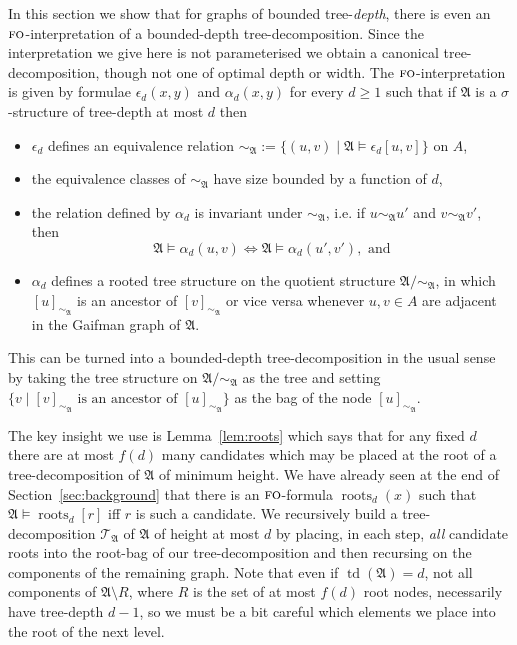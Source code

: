 \documentclass[11pt]{article}
\newcommand{\logic}[1]{\textsc{#1}}
\newcommand{\FO}{\logic{fo}}
\newcommand{\st}{\mathbin |}
\newcommand{\struct}[1]{\mathfrak{#1}}
\newcommand{\AS}{\struct{A}}
\newcommand{\td}{\operatorname{td}}
\DeclareMathOperator{\tdroot}{roots}
\begin{document}
In this section we show that for graphs of bounded tree-\emph{depth},
there is even an $\FO{}$-interpretation of a bounded-depth
tree-decomposition. Since the interpretation we give here is not
parameterised we obtain a canonical tree-decomposition, though not one
of optimal depth or width. The $\FO{}$-interpretation is given by
formulae $\epsilon_d(x,y)$ and $\alpha_d(x,y)$ for every $d \geq 1$
such that if $\AS$ is a $\sigma$-structure of tree-depth at most $d$
then
\begin{itemize}
\item $\epsilon_d$ defines an equivalence relation $\sim_\AS := \{ (u,v) \st \AS
  \models \epsilon_d[u,v] \}$ on $A$, 
\item the equivalence classes of $\sim_\AS$ have size bounded by a
  function of $d$,
\item the relation defined by $\alpha_d$ is invariant under $\sim_\AS$,
  i.e. if $u \sim_\AS u'$ and $v \sim_\AS v'$, then
  \[
  \AS \models \alpha_d(u,v) \iff \AS \models
  \alpha_d(u',v'),\text{ and}
  \]
\item $\alpha_d$ defines a rooted tree structure on the quotient structure $\AS/\!\!\!\sim_{\AS}$,
  in which $[u]_{\sim_\AS}$ is an ancestor of $[v]_{\sim_\AS}$ or vice
  versa whenever $u,v \in A$ are adjacent in the Gaifman graph of
  $\AS$.
\end{itemize}
This can be turned into a bounded-depth tree-decomposition in the
usual sense by taking the tree structure on $\AS/\!\!\sim_\AS$ as the tree
and setting 
$\{ v \st [v]_{\sim_\AS}\text{ is an ancestor of }[u]_{\sim_\AS} \}$
as the bag of the node $[u]_{\sim_\AS}$.

The key insight we use is Lemma~\ref{lem:roots} which says that for any fixed
$d$ there are at most $f(d)$ many candidates which may be placed at the root of
a tree-decomposition of $\AS$ of minimum height. We have already seen at the end
of Section~\ref{sec:background} that there is an $\FO{}$-formula
$\tdroot_d(x)$ such that $\AS \models \tdroot_d[r]$ iff $r$ is such a
candidate. We recursively build a tree-decomposition $\mathcal{T}_\AS$ of $\AS$ of
height at most $d$ by placing, in each step, \emph{all} candidate roots into the
root-bag of our tree-decomposition and then recursing on the components of the
remaining graph. Note that even if $\td(\AS) = d$, not all components of $\AS \setminus R$,
where $R$ is the set of at most $f(d)$ root nodes, necessarily have tree-depth
$d-1$, so we must be a bit careful which elements we place into the root of the
next level.
\end{document}

